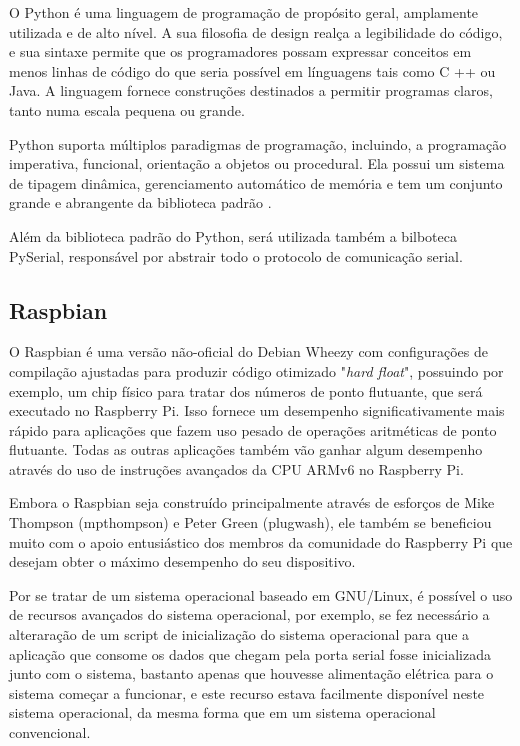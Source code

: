 \documentclass[final,12pt, times, 5p, twocolumn]{elsarticle}
\begin{document}
O Python é uma linguagem de programação de propósito geral, amplamente utilizada e de alto nível. A sua filosofia de design realça a legibilidade do código, e sua sintaxe permite que os programadores possam expressar conceitos em menos linhas de código do que seria possível em línguagens tais como C ++ ou Java. A linguagem fornece construções destinados a permitir programas claros, tanto numa escala pequena ou grande.

Python suporta múltiplos paradigmas de programação, incluindo, a programação imperativa, funcional, orientação a objetos ou procedural. Ela possui um sistema de tipagem dinâmica, gerenciamento automático de memória e tem um conjunto grande e abrangente da biblioteca padrão \cite{pythonsite}.

Além da biblioteca padrão do Python, será utilizada também a bilboteca PySerial, responsável por abstrair todo o protocolo de comunicação serial.

\subsection{Raspbian}

O Raspbian é uma versão não-oficial do Debian Wheezy com configurações de compilação ajustadas para produzir código otimizado "\textit{hard float}", possuindo por exemplo, um chip físico para tratar dos números de ponto flutuante, que será executado no Raspberry Pi. Isso fornece um desempenho significativamente mais rápido para aplicações que fazem uso pesado de operações aritméticas de ponto flutuante. Todas as outras aplicações também vão ganhar algum desempenho através do uso de instruções avançados da CPU ARMv6 no Raspberry Pi.

Embora o Raspbian seja construído principalmente através de esforços de Mike Thompson (mpthompson) e Peter Green (plugwash), ele também se beneficiou muito com o apoio entusiástico dos membros da comunidade do Raspberry Pi que desejam obter o máximo desempenho do seu dispositivo.

Por se tratar de um sistema operacional baseado em GNU/Linux, é possível o uso de recursos avançados do sistema operacional, por exemplo, se fez necessário a alteraração de um script de inicialização do sistema operacional para que a aplicação que consome os dados que chegam pela porta serial fosse inicializada junto com o sistema, bastanto apenas que houvesse alimentação elétrica para o sistema começar a funcionar, e este recurso estava facilmente disponível neste sistema operacional, da mesma forma que em um sistema operacional convencional.
\end{document}
